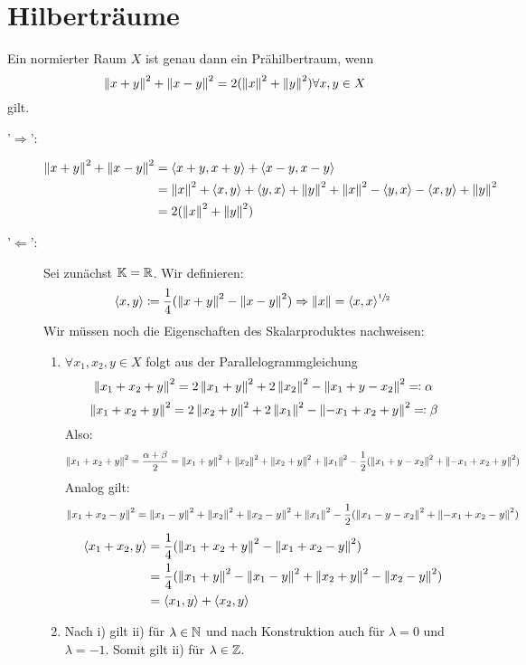 \chapter{Hilbertr\"aume}
\begin{satz}[Parallelogrammgleichung]
	Ein normierter Raum  $ X $ ist genau dann ein Pr\"ahilbertraum, wenn
	\[ \left\|x+y\right\|^2+\left\|x-y\right\|^2=2(\left\|x\right\|^2+\left\|y\right\|^2)\forall x,y\in X \]
	gilt.
\end{satz}
\begin{beweis}
	\begin{description}
		\item['$ \Rightarrow $':] \begin{align*}
		\left\|x+y\right\|^2+\left\|x-y\right\|^2&=\langle x+y,x+y\rangle+\langle x-y,x-y\rangle\\&=\left\|x\right\|^2+\langle x,y\rangle+\langle y,x\rangle+\left\|y\right\|^2+\left\|x\right\|^2-\langle y,x\rangle-\langle x,y\rangle+\left\|y\right\|^2\\&=2(\left\|x\right\|^2+\left\|y\right\|^2)
		\end{align*}
		\item['$ \Leftarrow $':] Sei zun\"achst $ \mathbb{K}=\mathbb{R} $. Wir definieren:
		\[ \langle x,y\rangle\coloneqq\frac{1}{4}(\left\|x+y\right\|^2-\left\|x-y\right\|^2)\Rightarrow\left\|x\right\|=\langle x,x\rangle^{\sfrac{1}{2}} \]
		Wir m\"ussen noch die Eigenschaften des Skalarproduktes nachweisen:
		\begin{enumerate}
			\item $ \forall x_1,x_2,y\in X $ folgt aus der Parallelogrammgleichung
			\[ \left\|x_1+x_2+y\right\|^2=2\left\|x_1+y\right\|^2+2\left\|x_2\right\|^2-\left\|x_1+y-x_2\right\|^2\eqqcolon\alpha \]
			\[ \left\|x_1+x_2+y\right\|^2=2\left\|x_2+y\right\|^2+2\left\|x_1\right\|^2-\left\|-x_1+x_2+y\right\|^2\eqqcolon\beta \]
			Also:
			\[ \left\|x_1+x_2+y\right\|^2=\frac{\alpha+\beta}{2}=\left\|x_1+y\right\|^2+\left\|x_2\right\|^2+\left\|x_2+y\right\|^2+\left\|x_1\right\|^2-\frac{1}{2}(\left\|x_1+y-x_2\right\|^2+\left\|-x_1+x_2+y\right\|^2) \]
			Analog gilt:
			\[ \left\|x_1+x_2-y\right\|^2=\left\|x_1-y\right\|^2+\left\|x_2\right\|^2+\left\|x_2-y\right\|^2+\left\|x_1\right\|^2-\frac{1}{2}(\left\|x_1-y-x_2\right\|^2+\left\|-x_1+x_2-y\right\|^2) \]
			\begin{align*} \langle x_1+x_2,y\rangle&=\frac{1}{4}(\left\|x_1+x_2+y\right\|^2-\left\|x_1+x_2-y\right\|^2)\\&=\frac{1}{4}(\left\|x_1+y\right\|^2-\left\|x_1-y\right\|^2+\left\|x_2+y\right\|^2-\left\|x_2-y\right\|^2)\\&=\langle x_1,y\rangle+\langle x_2,y\rangle \end{align*}
			\item Nach i) gilt ii) f\"ur $ \lambda\in\mathbb{N} $ und nach Konstruktion auch f\"ur $ \lambda=0 $ und $ \lambda=-1 $. Somit gilt ii) f\"ur $ \lambda\in\mathbb{Z} $.\\

\end{enumerate}
\end{description}
\end{beweis}
